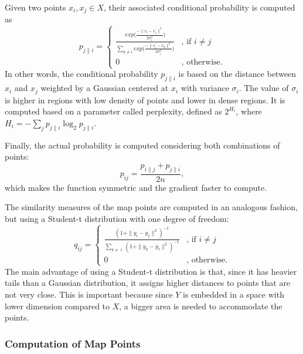 \documentclass[sn-basic]{sn-jnl}%
\theoremstyle{thmstyleone}%
\theoremstyle{thmstyletwo}%
\theoremstyle{thmstylethree}%
\begin{document}
Given two points $x_i, x_j \in X$, their associated conditional probability is computed as
\begin{equation}
\label{eq:p_ji_sne}
	p_{j\|i} =
	\begin{cases}
	\frac{exp \big(\frac{-\| x_i - x_j\|^2}{2\sigma_i^2}\big)}
	{\sum\limits_{k \neq i} exp \big(\frac{-\| x_i - x_k\|^2}{2\sigma_i^2}\big)} & \text{, if } i \neq j\\
	0 & \text{, otherwise.}
	\end{cases}
\end{equation}
In other words, the conditional probability $p_{j\|i}$ is based on the distance between $x_i$ and $x_j$ weighted by a Gaussian centered at $x_i$ with variance $\sigma_i$. The value of $\sigma_i$ is higher in regions with low density of points and lower in dense regions. It is computed based on a parameter called perplexity, defined as $2^{H_i}$, where $H_i = -\sum\limits_j p_{j\|i} \log_2 p_{j\|i}$.

Finally, the actual probability is computed considering both combinations of points:
\begin{equation}
	\label{eq:p_ij_tsne}	
	p_{ij} = \frac{p_{i\|j} + p_{j\|i}}{2n},
\end{equation}
which makes the function symmetric and the gradient faster to compute.

The similarity measures of the map points are computed in an analogous fashion, but using a Student-t distribution with one degree of freedom:
\begin{equation}
	\label{eq:q_ij_tsne}
	q_{ij} =
	\begin{cases}
	\frac{(1 + \| y_i - y_j\|^2)^{-1}}
	{\sum\limits_{k \neq \ell} (1 + \| y_k - y_\ell\|^2)^{-1}} & \text{, if } i \neq j\\
	0 & \text{, otherwise.}
	\end{cases}
\end{equation}
The main advantage of using a Student-t distribution is that, since it has heavier tails than a Gaussian distribution, it assigns higher distances to points that are not very close. This is important because since $Y$ is embedded in a space with lower dimension compared to $X$, a bigger area is needed to accommodate the points.

\subsubsection{Computation of Map Points}
\end{document}
